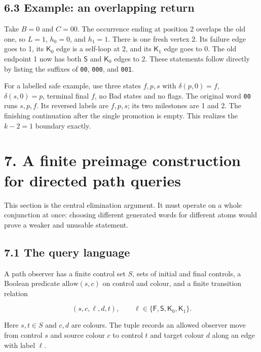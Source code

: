 \documentclass[
  11pt,
  a4paper,
]{article}
\begin{document}
\subsection{6.3 Example: an overlapping
return}\label{example-an-overlapping-return}

Take \(B=0\) and \(C=00\). The occurrence ending at position 2 overlaps
the old one, so \(L=1\), \(h_0=0\), and \(h_1=1\). There is one fresh
vertex 2. Its failure edge goes to 1, its \(\mathsf K_0\) edge is a
self-loop at 2, and its \(\mathsf K_1\) edge goes to 0. The old endpoint
1 now has both \(\mathsf S\) and \(\mathsf K_0\) edges to 2. These
statements follow directly by listing the suffixes of \texttt{00},
\texttt{000}, and \texttt{001}.

For a labelled safe example, use three states \(f,p,s\) with
\(\delta(p,0)=f\), \(\delta(s,0)=p\), terminal final \(f\), no Bad
states and no flags. The original word \texttt{00} runs \(s,p,f\). Its
reversed labels are \(f,p,s\); its two milestones are 1 and 2. The
finishing continuation after the single promotion is empty. This
realizes the \(k-2=1\) boundary exactly.


\section{7. A finite preimage construction for directed path
queries}\label{a-finite-preimage-construction-for-directed-path-queries}

This section is the central elimination argument. It must operate on a
whole conjunction at once: choosing different generated words for
different atoms would prove a weaker and unusable statement.

\subsection{7.1 The query language}\label{the-query-language}

A path observer has a finite control set \(S\), sets of initial and
final controls, a Boolean predicate \(\mathrm{allow}(s,c)\) on control
and colour, and a finite transition relation

\[(s,c,\ell,d,t),\qquad \ell\in\{\mathsf F,\mathsf S,\mathsf K_0,\mathsf K_1\}.\]

Here \(s,t\in S\) and \(c,d\) are colours. The tuple records an allowed
observer move from control \(s\) and source colour \(c\) to control
\(t\) and target colour \(d\) along an edge with label \(\ell\).
\end{document}
